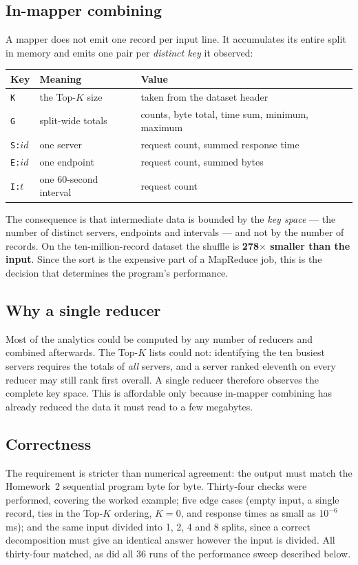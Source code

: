 \documentclass[11pt,a4paper]{article}
\begin{document}
\subsection{In-mapper combining}
A mapper does not emit one record per input line. It accumulates its entire split in
memory and emits one pair per \emph{distinct key} it observed:

\begin{center}\small
\begin{tabular}{@{}llp{8.2cm}@{}}
\toprule
\textbf{Key} & \textbf{Meaning} & \textbf{Value} \\
\midrule
\texttt{K} & the Top-$K$ size & taken from the dataset header \\
\texttt{G} & split-wide totals & counts, byte total, time sum, minimum, maximum \\
\texttt{S:$id$} & one server & request count, summed response time \\
\texttt{E:$id$} & one endpoint & request count, summed bytes \\
\texttt{I:$t$} & one 60-second interval & request count \\
\bottomrule
\end{tabular}
\end{center}

The consequence is that intermediate data is bounded by the \emph{key space} --- the
number of distinct servers, endpoints and intervals --- and not by the number of
records. On the ten-million-record dataset the shuffle is
\textbf{278$\times$ smaller than the input}. Since the sort is the
expensive part of a MapReduce job, this is the decision that determines the program's
performance.

\subsection{Why a single reducer}
Most of the analytics could be computed by any number of reducers and combined
afterwards. The Top-$K$ lists could not: identifying the ten busiest servers requires
the totals of \emph{all} servers, and a server ranked eleventh on every reducer may
still rank first overall. A single reducer therefore observes the complete key space.
This is affordable only because in-mapper combining has already reduced the data it must
read to a few megabytes.

\subsection{Correctness}
The requirement is stricter than numerical agreement: the output must match the
Homework~2 sequential program byte for byte. Thirty-four checks were performed, covering
the worked example; five edge cases (empty input, a single record, ties in the Top-$K$
ordering, $K=0$, and response times as small as $10^{-6}$\,ms); and the same input
divided into 1, 2, 4 and 8 splits, since a correct decomposition must give an identical
answer however the input is divided. All thirty-four matched, as did all
36 runs of the performance sweep described below.
\end{document}
